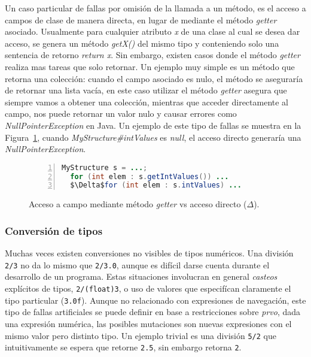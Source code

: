 Un caso particular de fallas por omisi\'on de la llamada a un m\'etodo, es el acceso a campos de clase de manera directa, en lugar de mediante el m\'etodo \emph{getter} asociado. Usualmente para cualquier atributo \emph{x} de una clase al cual se desea dar acceso, se genera un m\'etodo \emph{getX()} del mismo tipo y conteniendo solo una sentencia de retorno \emph{return x}. Sin embargo, existen casos donde el m\'etodo \emph{getter} realiza mas tareas que solo retornar. Un ejemplo muy simple es un m\'etodo que retorna una colecci\'on: cuando el campo asociado es nulo, el m\'etodo se asegurar\'ia de retornar una lista vac\'ia, en este caso utilizar el m\'etodo \emph{getter} asegura que siempre vamos a obtener una colecci\'on, mientras que acceder directamente al campo, nos puede retornar un valor nulo y causar errores como \emph{NullPointerException} en Java. Un ejemplo de este tipo de fallas se muestra en la Figura~\ref{figures.examples.getterVsDirectAccess}, cuando \emph{MyStructure\#intValues} es \emph{null}, el acceso directo generar\'ia una \emph{NullPointerException}.

\begin{figure}
	\begin{lstlisting}[frame=single, numbers=left, mathescape=true,framexleftmargin=.073\textwidth,xleftmargin=.085\textwidth,xrightmargin=0.012\textwidth,language=Java,basicstyle={}]
  MyStructure s = ...;
  for (int elem : s.getIntValues()) ...
  $\Delta$for (int elem : s.intValues) ...
	\end{lstlisting}
	\caption{Acceso a campo mediante m\'etodo \emph{getter} vs acceso directo ($\Delta$).}
	\label{figures.examples.getterVsDirectAccess}
\end{figure}

\subsubsection{Conversi\'on de tipos}

Muchas veces existen conversiones no visibles de tipos num\'ericos. Una divisi\'on \texttt{2/3} no da lo mismo que \texttt{2/3.0}, aunque es dif\'icil darse cuenta durante el desarrollo de un programa. Estas situaciones involucran en general \emph{casteos} expl\'icitos de tipos, \texttt{2/(float)3}, o uso de valores que especif\'ican claramente el tipo particular (\texttt{3.0f}). Aunque no relacionado con expresiones de navegaci\'on, este tipo de fallas artificiales se puede definir en base a restricciones sobre \emph{prvo}, dada una expresi\'on num\'erica, las posibles mutaciones son nuevas expresiones con el mismo valor pero distinto tipo. Un ejemplo trivial es una divisi\'on \texttt{5/2} que intuitivamente se espera que retorne \texttt{2.5}, sin embargo retorna \texttt{2}.

